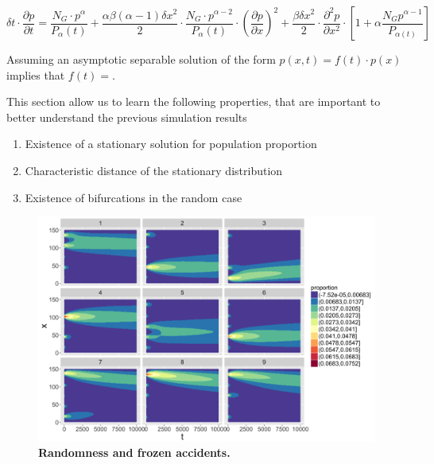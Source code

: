 \documentclass[10pt,letterpaper,draft]{article}
\begin{document}
\begin{equation}\label{eq:pde}
\delta t \cdot \frac{\partial p}{\partial t} = \frac{N_G \cdot p^{\alpha}}{P_{\alpha}(t)} + \frac{\alpha \beta (\alpha - 1) \delta x^2}{2}\cdot \frac{N_G \cdot p^{\alpha-2}}{P_{\alpha}(t)} \cdot \left(\frac{\partial p}{\partial x}\right)^2 + \frac{\beta \delta x^2}{2} \cdot \frac{\partial^2 p}{\partial x^2} \cdot\left[ 1 + \alpha \frac{N_G p^{\alpha - 1}}{P_{\alpha(t)}} \right]
\end{equation}

Assuming an asymptotic separable solution of the form $p(x,t)=f(t)\cdot p(x)$ implies that $f(t) = $. %


This section allow us to learn the following properties, that are important to better understand the previous simulation results
\begin{enumerate}
\item Existence of a stationary solution for population proportion
\item Characteristic distance of the stationary distribution
\item Existence of bifurcations in the random case
\end{enumerate}





\begin{figure}
\includegraphics[width=\textwidth]{figures/Fig4.png}
\caption{\textbf{Randomness and frozen accidents.}}
\label{fig:fig4}
\end{figure}
\end{document}
